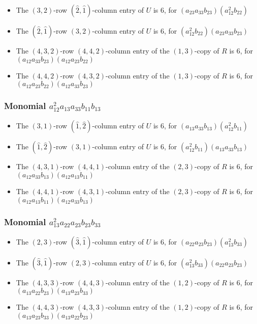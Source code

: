 \documentclass{article}
\begin{document}
\begin{itemize}
\item The $ \left(3, 2\right) $-row $ (\hat{2}, \hat{1}) $-column entry of $U$ is $ 6 $, for $( a_{23} a_{33} b_{23} )( a_{12}^{2} b_{22} )$ 
\item The $(\hat{2}, \hat{1})$-row $ \left(3, 2\right) $-column entry of $U$ is $ 6 $, for $( a_{12}^{2} b_{22} )( a_{23} a_{33} b_{23} )$ 
\item The $(4, 3, 2)$-row $(4, 4, 2)$-column entry of the $ \left(1, 3\right) $-copy of $R$ is $ 6 $, for $( a_{12} a_{33} b_{23} )( a_{12} a_{23} b_{22} )$ 
\item The $(4, 4, 2)$-row $(4, 3, 2)$-column entry of the $ \left(1, 3\right) $-copy of $R$ is $ 6 $, for $( a_{12} a_{23} b_{22} )( a_{12} a_{33} b_{23} )$ 
\end{itemize}
\subsubsection{Monomial $ a_{12}^{2} a_{13} a_{33} b_{11} b_{13} $}

\begin{itemize}
\item The $ \left(3, 1\right) $-row $ (\hat{1}, \hat{2}) $-column entry of $U$ is $ 6 $, for $( a_{13} a_{33} b_{13} )( a_{12}^{2} b_{11} )$ 
\item The $(\hat{1}, \hat{2})$-row $ \left(3, 1\right) $-column entry of $U$ is $ 6 $, for $( a_{12}^{2} b_{11} )( a_{13} a_{33} b_{13} )$ 
\item The $(4, 3, 1)$-row $(4, 4, 1)$-column entry of the $ \left(2, 3\right) $-copy of $R$ is $ 6 $, for $( a_{12} a_{33} b_{13} )( a_{12} a_{13} b_{11} )$ 
\item The $(4, 4, 1)$-row $(4, 3, 1)$-column entry of the $ \left(2, 3\right) $-copy of $R$ is $ 6 $, for $( a_{12} a_{13} b_{11} )( a_{12} a_{33} b_{13} )$ 
\end{itemize}
\subsubsection{Monomial $ a_{13}^{2} a_{22} a_{23} b_{23} b_{33} $}

\begin{itemize}
\item The $ \left(2, 3\right) $-row $ (\hat{3}, \hat{1}) $-column entry of $U$ is $ 6 $, for $( a_{22} a_{23} b_{23} )( a_{13}^{2} b_{33} )$ 
\item The $(\hat{3}, \hat{1})$-row $ \left(2, 3\right) $-column entry of $U$ is $ 6 $, for $( a_{13}^{2} b_{33} )( a_{22} a_{23} b_{23} )$ 
\item The $(4, 3, 3)$-row $(4, 4, 3)$-column entry of the $ \left(1, 2\right) $-copy of $R$ is $ 6 $, for $( a_{13} a_{22} b_{23} )( a_{13} a_{23} b_{33} )$ 
\item The $(4, 4, 3)$-row $(4, 3, 3)$-column entry of the $ \left(1, 2\right) $-copy of $R$ is $ 6 $, for $( a_{13} a_{23} b_{33} )( a_{13} a_{22} b_{23} )$ 
\end{itemize}
\end{document}

